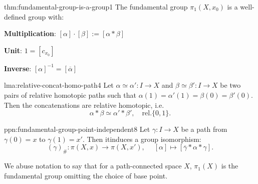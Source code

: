 \documentclass[landscape, 8pt]{extarticle}
\begin{document}
\begin{multicols*}{3}
\vspace{-7pt}
\begin{thm}{thm:fundamental-group-is-a-group}{1}
	\vspace{-2pt}
	The fundamental group $\pi_{1}(X, x_{0})$ is a well-defined group with:
	\begin{itemize-tight}
	    \item \textbf{Multiplication}: $[\alpha] \cdot [\beta] := [\alpha \ast \beta]$
			\begin{multicols}{2}
			\item \textbf{Unit}: $1 = [c_{x_{0}}]$
			\item \textbf{Inverse}: $[\alpha]^{-1} = [\overline{\alpha}]$
			\end{multicols}
	\end{itemize-tight}
\end{thm}

\vspace{-7pt}
\begin{lma}{lma:relative-concat-homo-path}{4}
	\vspace{-2pt}
	Let $\alpha \simeq \alpha' : I \to X$ and $\beta \simeq \beta' : I \to X$ be two pairs of relative homotopic paths such that $\alpha(1) = \alpha'(1) = \beta(0) = \beta'(0)$. Then the concatenations are relative homotopic, i.e.
	\vspace{-2pt}
	\[\alpha \ast \beta \simeq \alpha' \ast \beta', \quad \mathrm{rel. } \{0,1\}.\]
\end{lma}

\vspace{-7pt}
\begin{ppn}{ppn:fundamental-group-point-independent}{8}
	\vspace{-2pt}
	Let $\gamma : I \to X$ be a path from $\gamma(0) = x$ to $\gamma(1) = x'$. Then it\newline induces a group isomorphism:
	\[(\gamma)_{\#} : \pi(X, x) \to \pi(X, x'),\;\quad [\alpha] \mapsto [\overline{\gamma} \ast \alpha \ast \gamma].\]
	\par\vspace{-4pt}
	\tcbline
	We abuse notation to say that for a path-connected space $X$, $\pi_{1}(X)$ is the fundamental group omitting the choice of base point.
\end{ppn}


\end{multicols*}
\end{document}
